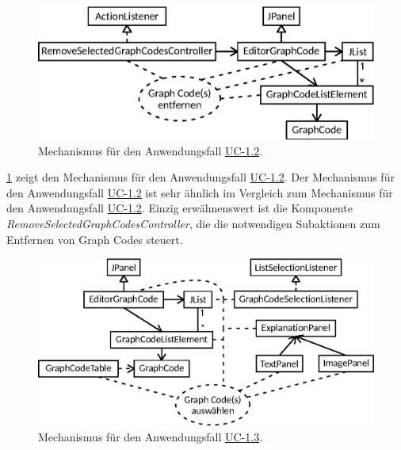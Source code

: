 \begin{figure}[htb]
    \centering
    \includegraphics{chapter/chapter_3/mechanisms/mechanism-uc-1.2.eps}
    \caption{Mechanismus für den Anwendungsfall \hyperref[sec3:model:uc-1.2]{UC-1.2}.}
    \label{sec3:model:par:mechanism-use-cases:fig:mech-uc-1.2}
\end{figure}
\cref{sec3:model:par:mechanism-use-cases:fig:mech-uc-1.2} zeigt den Mechanismus für den Anwendungsfall \hyperref[sec3:model:uc-1.2]{UC-1.2}.
Der Mechanismus für den Anwendungsfall \hyperref[sec3:model:uc-1.2]{UC-1.2} ist sehr ähnlich im Vergleich zum Mechanismus für den Anwendungsfall \hyperref[sec3:model:uc-1.2]{UC-1.2}.
Einzig erwähnenswert ist die Komponente \textit{RemoveSelectedGraphCodesController}, die die notwendigen Subaktionen zum Entfernen von Graph Codes steuert.

\begin{figure}[htb]
    \centering
    \includegraphics{chapter/chapter_3/mechanisms/mechanism-uc-1.3.eps}
    \caption{Mechanismus für den Anwendungsfall \hyperref[sec3:model:uc-1.3]{UC-1.3}.}
    \label{sec3:model:par:mechanism-use-cases:fig:mech-uc-1.3}
\end{figure}

